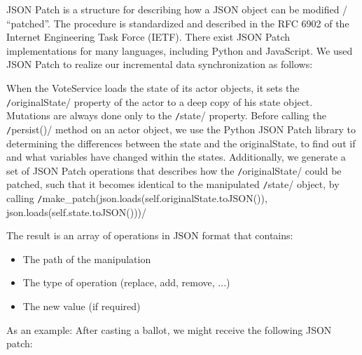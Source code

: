 JSON Patch is a structure for describing how a JSON object can be modified / "`patched"'. The procedure is standardized and described in the RFC 6902 of the Internet Engineering Task Force (IETF). There exist JSON Patch implementations for many languages, including Python and JavaScript. We used JSON Patch to realize our incremental data synchronization as follows:

When the VoteService loads the state of its actor objects, it sets the \texttt/originalState/ property of the actor to a deep copy of his state object. Mutations are always done only to the \texttt/state/ property. Before calling the \texttt/persist()/ method on an actor object, we use the Python JSON Patch library to determining the differences between the state and the originalState, to find out if and what variables have changed within the states. Additionally, we generate a set of JSON Patch operations that describes how the \texttt/originalState/ could be patched, such that it becomes identical to the manipulated \texttt/state/ object, by calling 
\texttt/make_patch(json.loads(self.originalState.toJSON()), json.loads(self.state.toJSON()))/

The result is an array of operations in JSON format that contains:
\begin{itemize}
	\item The path of the manipulation
	\item The type of operation (replace, add, remove, ...)
	\item The new value (if required)
\end{itemize}

As an example: After casting a ballot, we might receive the following JSON patch:

